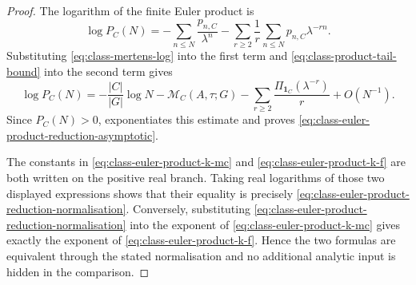 \documentclass[11pt,a4paper]{amsart}
\theoremstyle{plain}
\theoremstyle{definition}
\theoremstyle{remark}
\begin{document}
\begin{proof}
  The logarithm of the finite Euler product is
  \[
    \log P_C(N)
    =
    -\sum_{n\le N}\frac{p_{n,C}}{\lambda^n}
    -
    \sum_{r\ge2}\frac1r\sum_{n\le N}p_{n,C}\lambda^{-rn}.
  \]
  Substituting \eqref{eq:class-mertens-log} into the first term and
  \eqref{eq:class-product-tail-bound} into the second term gives
  \[
    \log P_C(N)
    =
    -\frac{|C|}{|G|}\log N
    -\mathcal M_C(A,\tau;G)
    -\sum_{r\ge2}\frac{\Pi_{\mathbf1_C}(\lambda^{-r})}{r}
    +O(N^{-1}).
  \]
  Since \(P_C(N)>0\), 
  exponentiates this estimate and proves
  \eqref{eq:class-euler-product-reduction-asymptotic}.

  The constants in \eqref{eq:class-euler-product-k-mc} and
  \eqref{eq:class-euler-product-k-f} are both written on the positive real
  branch.  Taking real logarithms of those two displayed expressions shows
  that their equality is precisely
  \eqref{eq:class-euler-product-reduction-normalisation}.  Conversely,
  substituting \eqref{eq:class-euler-product-reduction-normalisation} into
  the exponent of \eqref{eq:class-euler-product-k-mc} gives exactly the
  exponent of \eqref{eq:class-euler-product-k-f}.  Hence the two formulas are
  equivalent through the stated normalisation and no additional analytic input
  is hidden in the comparison.
\end{proof}
\end{document}
